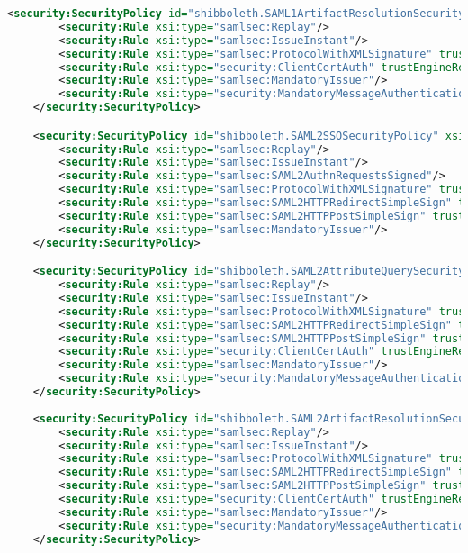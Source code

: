 \begin{lstlisting}[language=xml]
    <security:SecurityPolicy id="shibboleth.SAML1ArtifactResolutionSecurityPolicy" xsi:type="security:SecurityPolicyType">
        <security:Rule xsi:type="samlsec:Replay"/>
        <security:Rule xsi:type="samlsec:IssueInstant"/>
        <security:Rule xsi:type="samlsec:ProtocolWithXMLSignature" trustEngineRef="shibboleth.SignatureTrustEngine"/>
        <security:Rule xsi:type="security:ClientCertAuth" trustEngineRef="shibboleth.CredentialTrustEngine"/>
        <security:Rule xsi:type="samlsec:MandatoryIssuer"/>
        <security:Rule xsi:type="security:MandatoryMessageAuthentication"/>
    </security:SecurityPolicy>

    <security:SecurityPolicy id="shibboleth.SAML2SSOSecurityPolicy" xsi:type="security:SecurityPolicyType">
        <security:Rule xsi:type="samlsec:Replay"/>
        <security:Rule xsi:type="samlsec:IssueInstant"/>
        <security:Rule xsi:type="samlsec:SAML2AuthnRequestsSigned"/>
        <security:Rule xsi:type="samlsec:ProtocolWithXMLSignature" trustEngineRef="shibboleth.SignatureTrustEngine"/>
        <security:Rule xsi:type="samlsec:SAML2HTTPRedirectSimpleSign" trustEngineRef="shibboleth.SignatureTrustEngine"/>
        <security:Rule xsi:type="samlsec:SAML2HTTPPostSimpleSign" trustEngineRef="shibboleth.SignatureTrustEngine"/>
        <security:Rule xsi:type="samlsec:MandatoryIssuer"/>
    </security:SecurityPolicy>

    <security:SecurityPolicy id="shibboleth.SAML2AttributeQuerySecurityPolicy" xsi:type="security:SecurityPolicyType">
        <security:Rule xsi:type="samlsec:Replay"/>
        <security:Rule xsi:type="samlsec:IssueInstant"/>
        <security:Rule xsi:type="samlsec:ProtocolWithXMLSignature" trustEngineRef="shibboleth.SignatureTrustEngine"/>
        <security:Rule xsi:type="samlsec:SAML2HTTPRedirectSimpleSign" trustEngineRef="shibboleth.SignatureTrustEngine"/>
        <security:Rule xsi:type="samlsec:SAML2HTTPPostSimpleSign" trustEngineRef="shibboleth.SignatureTrustEngine"/>
        <security:Rule xsi:type="security:ClientCertAuth" trustEngineRef="shibboleth.CredentialTrustEngine"/>
        <security:Rule xsi:type="samlsec:MandatoryIssuer"/>
        <security:Rule xsi:type="security:MandatoryMessageAuthentication"/>
    </security:SecurityPolicy>
    
    <security:SecurityPolicy id="shibboleth.SAML2ArtifactResolutionSecurityPolicy" xsi:type="security:SecurityPolicyType">
        <security:Rule xsi:type="samlsec:Replay"/>
        <security:Rule xsi:type="samlsec:IssueInstant"/>
        <security:Rule xsi:type="samlsec:ProtocolWithXMLSignature" trustEngineRef="shibboleth.SignatureTrustEngine"/>
        <security:Rule xsi:type="samlsec:SAML2HTTPRedirectSimpleSign" trustEngineRef="shibboleth.SignatureTrustEngine"/>
        <security:Rule xsi:type="samlsec:SAML2HTTPPostSimpleSign" trustEngineRef="shibboleth.SignatureTrustEngine"/>
        <security:Rule xsi:type="security:ClientCertAuth" trustEngineRef="shibboleth.CredentialTrustEngine"/>
        <security:Rule xsi:type="samlsec:MandatoryIssuer"/>
        <security:Rule xsi:type="security:MandatoryMessageAuthentication"/>
    </security:SecurityPolicy>
    

\end{lstlisting}

